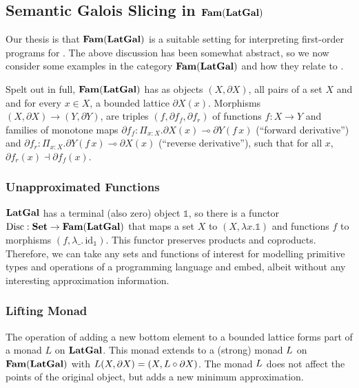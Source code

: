 
\subsection{Semantic Galois Slicing in $\mathbf{Fam}(\mathbf{LatGal})$}
\label{sec:semantic-gps}

Our thesis is that $\mathbf{Fam}(\mathbf{LatGal})$ is a suitable setting for
interpreting first-order programs for \GPS. The above discussion has
been somewhat abstract, so we now consider some examples in the
category $\mathbf{Fam}(\mathbf{LatGal})$ and how they relate to \GPS.

Spelt out in full, $\mathbf{Fam}(\mathbf{LatGal})$ has as objects $(X, \partial X)$,
all pairs of a set $X$ and and for every $x \in X$, a bounded lattice
$\partial X(x)$. Morphisms $(X, \partial X) \to (Y, \partial Y)$, are
triples $(f, \partial f_f, \partial f_r)$ of functions $f : X \to Y$
and families of monotone maps
$\partial f_f : \Pi_{x : X}.\partial X(x) \multimap \partial Y(f\,x)$
(``forward derivative'') and
$\partial f_r : \Pi_{x : X}. \partial Y(f\,x) \multimap \partial X(x)$
(``reverse derivative''), such that for all $x$,
$\partial f_r(x) \dashv \partial f_f(x)$.

\subsubsection{Unapproximated Functions}
\label{sec:unapproximated-functions}

$\mathbf{LatGal}$ has a terminal (also zero) object $\mathbb{1}$, so there is
a functor $\mathrm{Disc} : \mathbf{Set} \to \mathbf{Fam}(\mathbf{LatGal})$ that maps a set $X$ to
$(X, \lambda x. \mathbb{1})$ and functions $f$ to morphisms
$(f, \lambda\_.\,\mathrm{id}_{\mathbb{1}})$. This functor preserves
products and coproducts. Therefore, we can take any sets and functions
of interest for modelling primitive types and operations of a
programming language and embed, albeit without any interesting
approximation information.

\subsubsection{Lifting Monad}
\label{sec:models-of-total-gps:lifting}

The operation of adding a new bottom element to a bounded lattice
forms part of a monad $L$ on $\mathbf{LatGal}$. This monad extends to a
(strong) monad $L$ on $\mathbf{Fam}(\mathbf{LatGal})$ with
$L(X, \partial X) = (X, L \circ \partial X)$. The monad $L$
does not affect the points of the original object, but adds a new
minimum approximation.

